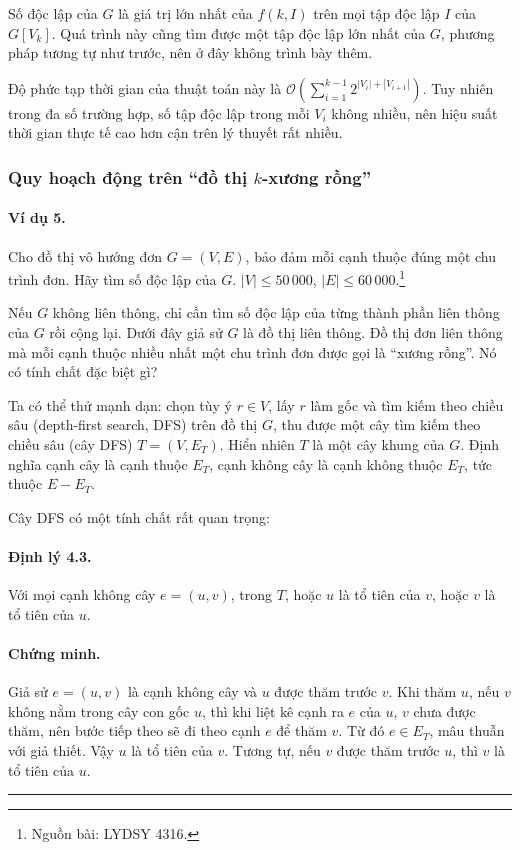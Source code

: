 \documentclass[11pt]{article}
\newcommand{\Oh}{\mathcal{O}}
\newcommand{\qedmark}{\hfill\rule{0.7ex}{0.7ex}}
\begin{document}
Số độc lập của \(G\) là giá trị lớn nhất của \(f(k,I)\) trên mọi tập độc lập
\(I\) của \(G[V_k]\). Quá trình này cũng tìm được một tập độc lập lớn nhất của
\(G\), phương pháp tương tự như trước, nên ở đây không trình bày thêm.

Độ phức tạp thời gian của thuật toán này là
\(\Oh\!\left(\sum_{i=1}^{k-1}2^{|V_i|+|V_{i+1}|}\right)\). Tuy nhiên trong đa
số trường hợp, số tập độc lập trong mỗi \(V_i\) không nhiều, nên hiệu suất thời
gian thực tế cao hơn cận trên lý thuyết rất nhiều.

\subsubsection{Quy hoạch động trên ``đồ thị \texorpdfstring{\(k\)}{k}-xương rồng''}

\paragraph{Ví dụ 5.}
Cho đồ thị vô hướng đơn \(G=(V,E)\), bảo đảm mỗi cạnh thuộc đúng một chu trình
đơn. Hãy tìm số độc lập của \(G\). \(|V|\le 50\,000\),
\(|E|\le 60\,000\).\footnote{Nguồn bài: LYDSY 4316.}

Nếu \(G\) không liên thông, chỉ cần tìm số độc lập của từng thành phần liên
thông của \(G\) rồi cộng lại. Dưới đây giả sử \(G\) là đồ thị liên thông. Đồ
thị đơn liên thông mà mỗi cạnh thuộc nhiều nhất một chu trình đơn được gọi là
``xương rồng''. Nó có tính chất đặc biệt gì?

Ta có thể thử mạnh dạn: chọn tùy ý \(r\in V\), lấy \(r\) làm gốc và tìm kiếm
theo chiều sâu (depth-first search, DFS) trên đồ thị \(G\), thu được một cây
tìm kiếm theo chiều sâu (cây DFS) \(T=(V,E_T)\). Hiển nhiên \(T\) là một cây
khung của \(G\). Định nghĩa cạnh cây là cạnh thuộc \(E_T\), cạnh không cây là
cạnh không thuộc \(E_T\), tức thuộc \(E-E_T\).

Cây DFS có một tính chất rất quan trọng:

\paragraph{Định lý 4.3.}
Với mọi cạnh không cây \(e=(u,v)\), trong \(T\), hoặc \(u\) là tổ tiên của
\(v\), hoặc \(v\) là tổ tiên của \(u\).

\paragraph{Chứng minh.}
Giả sử \(e=(u,v)\) là cạnh không cây và \(u\) được thăm trước \(v\). Khi thăm
\(u\), nếu \(v\) không nằm trong cây con gốc \(u\), thì khi liệt kê cạnh ra
\(e\) của \(u\), \(v\) chưa được thăm, nên bước tiếp theo sẽ đi theo cạnh \(e\)
để thăm \(v\). Từ đó \(e\in E_T\), mâu thuẫn với giả thiết. Vậy \(u\) là tổ
tiên của \(v\). Tương tự, nếu \(v\) được thăm trước \(u\), thì \(v\) là tổ tiên
của \(u\). \qedmark
\end{document}
